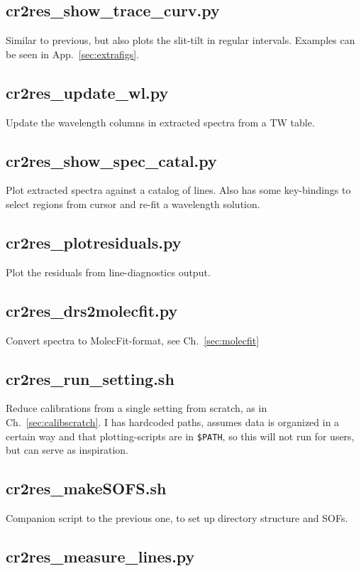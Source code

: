 \subsection{cr2res\_show\_trace\_curv.py}
Similar to previous, but also plots the slit-tilt in regular intervals. Examples
can be seen in App.~\ref{sec:extrafigs}.

\subsection{cr2res\_update\_wl.py}
Update the wavelength columns in extracted spectra from a TW table.

\subsection{cr2res\_show\_spec\_catal.py}
Plot extracted spectra against a catalog of lines. Also has some key-bindings
to select regions from cursor and re-fit a wavelength solution.

\subsection{cr2res\_plotresiduals.py}
Plot the residuals from line-diagnostics output.

\subsection{cr2res\_drs2molecfit.py}
Convert spectra to MolecFit-format, see Ch.~\ref{sec:molecfit}

\subsection{cr2res\_run\_setting.sh}
Reduce calibrations from a single setting from scratch, as in
Ch.~\ref{sec:calibscratch}. I has hardcoded paths, assumes data is organized in
a certain way and that plotting-scripts are in \verb!$PATH!, so this will not
run for users, but can serve as inspiration.

\subsection{cr2res\_makeSOFS.sh}
Companion script to the previous one, to set up directory structure and SOFs.

\subsection{cr2res\_measure\_lines.py}
